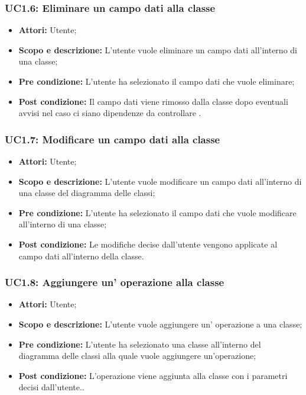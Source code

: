 \documentclass[a4paper]{report}
\begin{document}
\subsubsection{UC1.6: Eliminare un campo dati alla classe}
\begin{itemize}
	\item \textbf{Attori:} Utente;
	\item \textbf{Scopo e descrizione: }L'utente vuole eliminare un campo dati all'interno di una classe;
	\item \textbf{Pre condizione: }L'utente ha selezionato il campo dati che vuole eliminare;
	\item \textbf{Post condizione: }Il campo dati viene rimosso dalla classe dopo eventuali avvisi nel caso ci siano dipendenze da controllare .
\end{itemize}

\subsubsection{UC1.7: Modificare un campo dati alla classe}
\begin{itemize}
	\item \textbf{Attori:} Utente;
	\item \textbf{Scopo e descrizione: }L'utente vuole modificare un campo dati all'interno di una classe del diagramma delle classi;
	\item \textbf{Pre condizione: }L'utente ha selezionato il campo dati che vuole modificare all'interno di una classe;
	\item \textbf{Post condizione: }Le modifiche decise dall'utente vengono applicate al campo dati all'interno della classe.
\end{itemize}

\subsubsection{UC1.8: Aggiungere un' operazione alla classe}
\begin{itemize}
	\item \textbf{Attori:} Utente;
	\item \textbf{Scopo e descrizione: }L'utente vuole aggiungere un' operazione a una classe;
	\item \textbf{Pre condizione: }L'utente ha selezionato una classe all'interno del diagramma delle classi alla quale vuole aggiungere un'operazione;
	\item \textbf{Post condizione: }L'operazione viene aggiunta alla classe con i parametri decisi dall'utente..
\end{itemize}
\end{document}
